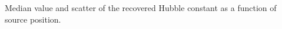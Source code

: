 \label{fig:srcpos} Median value and scatter of the recovered Hubble constant as a function of source position.